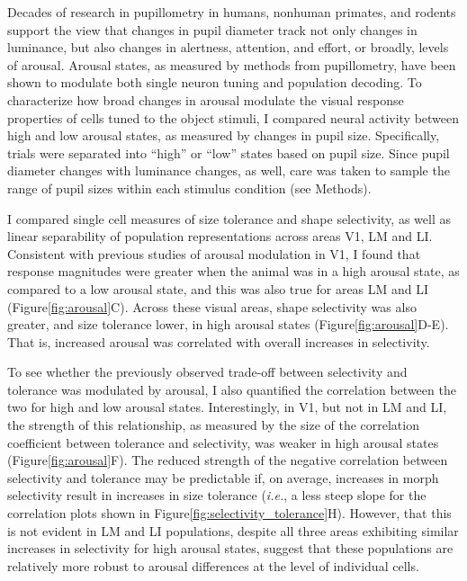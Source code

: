Decades of research in pupillometry in humans, nonhuman primates, and rodents support the view that changes in pupil diameter track not only changes in luminance, but also changes in alertness, attention, and effort, or broadly, levels of arousal\cite{Reimer2016, McGinley2015WakingResponses, Reimer2014, Vinck2015}. Arousal states, as measured by methods from pupillometry, have been shown to modulate both single neuron tuning and population decoding. To characterize how broad changes in arousal modulate the visual response properties of cells tuned to the object stimuli, I compared neural activity between high and low arousal states, as measured by changes in pupil size\cite{Liang2020, Stringer2019spontaneous}. Specifically, trials were separated into ``high'' or ``low'' states based on pupil size. Since pupil diameter changes with luminance changes, as well, care was taken to sample the range of pupil sizes within each stimulus condition (see Methods). 

I compared single cell measures of size tolerance and shape selectivity, as well as linear separability of population representations across areas V1, LM and LI. Consistent with previous studies of arousal modulation in V1, I found that response magnitudes were greater when the animal was in a high arousal state, as compared to a low arousal state, and this was also true for areas LM and LI (Figure\ref{fig:arousal}C). Across these visual areas, shape selectivity was also greater, and size tolerance lower, in high arousal states (Figure\ref{fig:arousal}D-E). That is, increased arousal was correlated with overall increases in selectivity.

To see whether the previously observed trade-off between selectivity and tolerance was modulated by arousal, I also quantified the correlation between the two for high and low arousal states. Interestingly, in V1, but not in LM and LI, the strength of this relationship, as measured by the size of the correlation coefficient between tolerance and selectivity, was weaker in high arousal states (Figure\ref{fig:arousal}F). The reduced strength of the negative correlation between selectivity and tolerance may be predictable if, on average, increases in morph selectivity result in increases in size tolerance (\textit{i.e.}, a less steep slope for the correlation plots shown in Figure\ref{fig:selectivity_tolerance}H). However, that this is not evident in LM and LI populations, despite all three areas exhibiting similar increases in selectivity for high arousal states, suggest that these populations are relatively more robust to arousal differences at the level of individual cells. 

